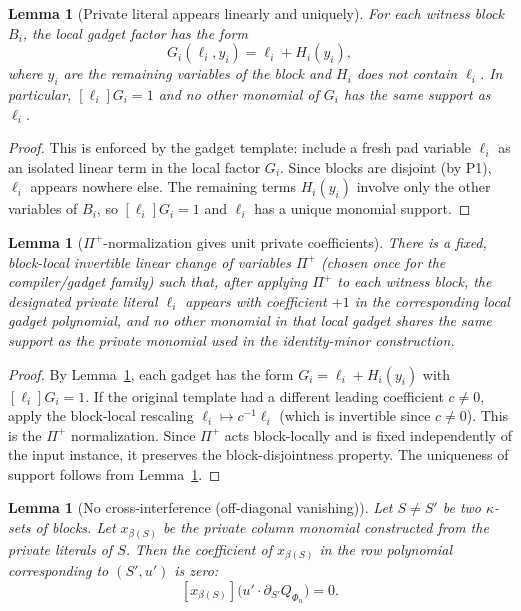 \documentclass[12pt]{article}
\newtheorem{lemma}[theorem]{Lemma}
\theoremstyle{definition}
\theoremstyle{definition}
\theoremstyle{remark}
\theoremstyle{remark}
\begin{document}
\begin{lemma}[Private literal appears linearly and uniquely]
\label{lem:private-linear-unique}
For each witness block $B_i$, the local gadget factor has the form
\[
G_i(\ell_i, y_i) = \ell_i + H_i(y_i),
\]
where $y_i$ are the remaining variables of the block and $H_i$ does not contain $\ell_i$.
In particular, $[\ell_i]G_i=1$ and no other monomial of $G_i$ has the same support as $\ell_i$.
\end{lemma}

\begin{proof}
This is enforced by the gadget template: include a fresh pad variable $\ell_i$ as an
isolated linear term in the local factor $G_i$. Since blocks are disjoint (by P1),
$\ell_i$ appears nowhere else. The remaining terms $H_i(y_i)$ involve only the other
variables of $B_i$, so $[\ell_i]G_i = 1$ and $\ell_i$ has a unique monomial support.
\end{proof}

\begin{lemma}[$\Pi^+$-normalization gives unit private coefficients]
\label{lem:pi-plus-unit}
There is a fixed, block-local invertible linear change of variables $\Pi^+$ (chosen once
for the compiler/gadget family) such that, after applying $\Pi^+$ to each witness block,
the designated private literal $\ell_i$ appears with coefficient $+1$ in the corresponding
local gadget polynomial, and no other monomial in that local gadget shares the same
support as the private monomial used in the identity-minor construction.
\end{lemma}

\begin{proof}
By Lemma~\ref{lem:private-linear-unique}, each gadget has the form $G_i = \ell_i + H_i(y_i)$
with $[\ell_i]G_i = 1$. If the original template had a different leading coefficient $c \neq 0$,
apply the block-local rescaling $\ell_i \mapsto c^{-1}\ell_i$ (which is invertible since $c \neq 0$).
This is the $\Pi^+$ normalization. Since $\Pi^+$ acts block-locally and is fixed
independently of the input instance, it preserves the block-disjointness property.
The uniqueness of support follows from Lemma~\ref{lem:private-linear-unique}.
\end{proof}

\begin{lemma}[No cross-interference (off-diagonal vanishing)]
\label{lem:no-cross-interference}
Let $S\neq S'$ be two $\kappa$-sets of blocks. Let $x_{\beta(S)}$ be the private column monomial
constructed from the private literals of $S$. Then the coefficient of $x_{\beta(S)}$ in the
row polynomial corresponding to $(S',u')$ is zero:
\[
[x_{\beta(S)}]\big(u'\cdot \partial_{S'} Q_{\Phi_n}\big)=0.
\]
\end{lemma}
\end{document}
